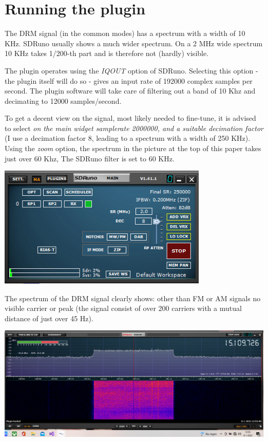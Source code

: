 \documentclass[10pt]{article}
\begin{document}
\section{Running the plugin}
The DRM signal (in the common modes)
has a spectrum with a width of 10 KHz. SDRuno usually shows
a much wider spectrum. On a 2 MHz wide spectrum 10 KHz takes 1/200-th part
and is therefore not (hardly) visible.
\par
The plugin operates using the {\em IQOUT} option of SDRuno. Selecting
this option - the plugin itself will do so - gives an input rate
of 192000 complex samples per second. The plugin software will take
care of filtering out a band of 10 Khz and decimating to 12000 samples/second.
\par
To get a decent view on the signal, most likely needed to fine-tune,
it is advised to select {\em on the main widget samplerate 2000000,
and a suitable decimation factor} (I use a decimation factor 8, leading to a
spectrum with a width of 250 KHz).
Using the {\em zoom}  option, the spectrum in the picture at the
top of this paper takes just over 60 Khz,
The SDRuno filter is set to 60 KHz.

\includegraphics[width=100mm]{drm-main-widget.png}

The spectrum of the DRM signal clearly shows: other than FM or AM signals 
no visible carrier or peak (the signal consist of over 200 carriers
with a mutual distance of just over 45 Hz).

\includegraphics[width=150mm]{drm-zoom.png}
\end{document}
